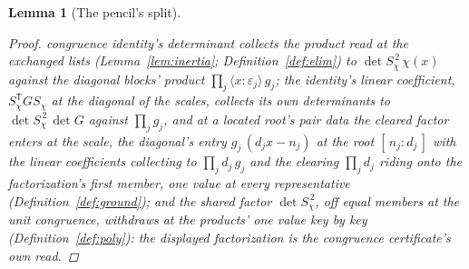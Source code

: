 \documentclass[11pt]{article}
\newtheorem{lemma}{Lemma}
\theoremstyle{definition}
\begin{document}
\begin{lemma}[The pencil's split]
\begin{proof}
congruence identity's determinant collects the product read at the
exchanged lists (Lemma~\ref{lem:inertia};
Definition~\ref{def:elim}) to $\det S_\chi^{\,2}\,\chi(x)$ against
the diagonal blocks' product
$\prod_j\langle x\!:\!\varepsilon_j\rangle\,g_j$; the identity's
linear coefficient, $S_\chi^{\mathsf T}GS_\chi$ at the diagonal of
the scales, collects its own determinants to
$\det S_\chi^{\,2}\,\det G$ against $\prod_jg_j$, and at a located
root's pair data the cleared factor enters at the scale, the
diagonal's entry $g_j\,(d_jx-n_j)$ at the root
$[\,n_j\!:\!d_j\,]$ with the linear coefficients collecting to
$\prod_jd_j\,g_j$ and the clearing $\prod_jd_j$ riding onto the
factorization's first member, one value at every representative
(Definition~\ref{def:ground}); and the shared
factor $\det S_\chi^{\,2}$, off equal members at the unit
congruence, withdraws at the products' one value key by key
(Definition~\ref{def:poly}): the displayed factorization is the
congruence certificate's own read.
\end{proof}
\end{lemma}
\end{document}
